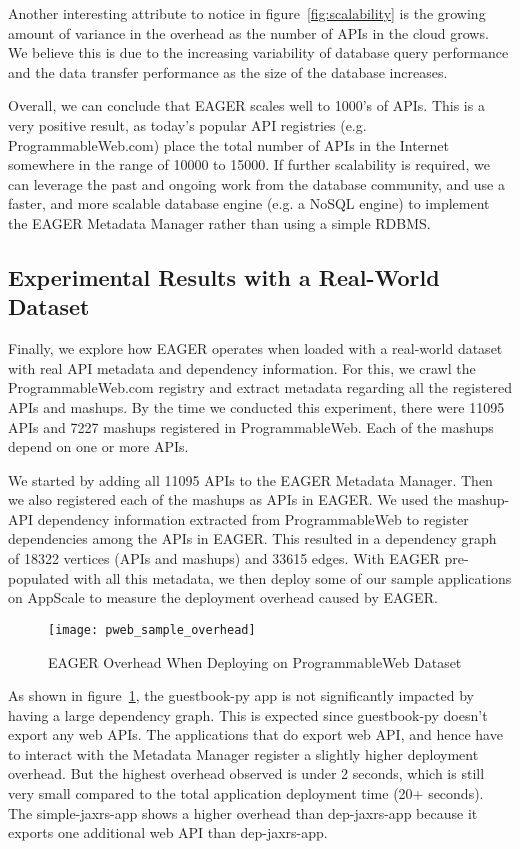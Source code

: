 Another interesting attribute to notice in figure~\ref{fig:scalability} is the growing amount of variance in the overhead as the number of APIs in the cloud grows.
We believe this is due to the increasing variability of database query performance and the data transfer performance as the size of the 
database increases.

Overall, we can conclude that EAGER scales well to 1000's of APIs. This is a very positive result, as today's popular API registries (e.g. ProgrammableWeb.com) 
place the total number of APIs in the Internet somewhere in the range of 10000 to 15000. If further scalability is required, we can leverage the past and ongoing
work from the database community, and use a faster, and more scalable database engine (e.g. a NoSQL engine) to implement the
EAGER Metadata Manager rather than using a simple RDBMS.

\subsection{Experimental Results with a Real-World Dataset}
Finally, we explore how EAGER operates when loaded with a real-world dataset with real API metadata and dependency information. For this, we 
crawl the ProgrammableWeb.com registry and extract metadata regarding all the registered APIs and mashups. By the time we conducted
this experiment, there were 11095 APIs and 7227 mashups registered in ProgrammableWeb. Each of the mashups depend on one or more APIs.

We started by adding all 11095 APIs to the EAGER Metadata Manager. Then we also registered each of the mashups as APIs in EAGER. We used the
mashup-API dependency information extracted from ProgrammableWeb to register dependencies among the APIs in EAGER. This resulted in a 
dependency graph of 18322 vertices (APIs and mashups) and 33615 edges. With EAGER pre-populated with all this metadata, we then deploy
some of our sample applications on AppScale to measure the deployment overhead caused by EAGER.

\begin{figure}
\centering
\texttt{[image: pweb\_sample\_overhead]}
\caption{EAGER Overhead When Deploying on ProgrammableWeb Dataset}
\label{fig:pweb_sample_overhead}
\end{figure}

As shown in figure~\ref{fig:pweb_sample_overhead}, the guestbook-py app is not significantly impacted by having a large dependency graph. This is
expected since guestbook-py doesn't export any web APIs. The applications that do export web API, and hence have to interact with the Metadata
Manager register a slightly higher deployment overhead. But the highest overhead observed is under 2 seconds, which is still very small compared
to the total application deployment time (20+ seconds). The simple-jaxrs-app shows a higher overhead than dep-jaxrs-app because it exports one
additional web API than dep-jaxrs-app. 

